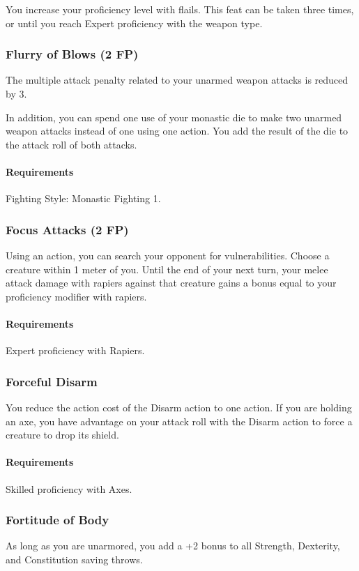     You increase your proficiency level with flails.
    This feat can be taken three times, or until you reach Expert proficiency with the weapon type.
\subsubsection{Flurry of Blows (2 FP)} \label{feat::flurryofblows}
    The multiple attack penalty related to your unarmed weapon attacks is reduced by 3.

    In addition, you can spend one use of your monastic die to make two unarmed weapon attacks instead of one using one action.
    You add the result of the die to the attack roll of both attacks.
    \paragraph{Requirements} Fighting Style: Monastic Fighting 1.
\subsubsection{Focus Attacks (2 FP)} \label{feat::focusattacks}
    Using an action, you can search your opponent for vulnerabilities.
    Choose a creature within 1 meter of you.
    Until the end of your next turn, your melee attack damage with rapiers against that creature gains a bonus equal to your proficiency modifier with rapiers.
    \paragraph{Requirements} Expert proficiency with Rapiers.
\subsubsection{Forceful Disarm} \label{feat::forcefuldisarm}
    You reduce the action cost of the Disarm action to one action.
    If you are holding an axe, you have advantage on your attack roll with the Disarm action to force a creature to drop its shield.
    \paragraph{Requirements} Skilled proficiency with Axes.
\subsubsection{Fortitude of Body} \label{feat::fortitudeofbody}
    As long as you are unarmored, you add a +2 bonus to all Strength, Dexterity, and Constitution saving throws.
